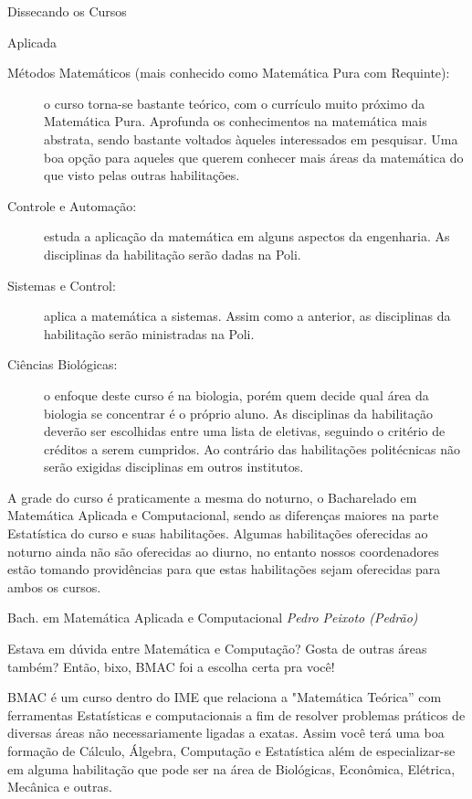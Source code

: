\begin{secao}{Dissecando os Cursos}
\begin{subsecao}{Aplicada}
\begin{description}
\item [Métodos Matemáticos (mais conhecido como Matemática Pura com Requinte):] o curso torna-se bastante teórico, com o currículo muito próximo da Matemática Pura. Aprofunda os conhecimentos na matemática mais abstrata, sendo bastante voltados àqueles interessados em pesquisar. Uma boa opção para aqueles que querem conhecer mais áreas da matemática do que visto pelas outras habilitações. 
\item [Controle e Automação:] estuda a aplicação da matemática em alguns aspectos da engenharia. As disciplinas da habilitação serão dadas na Poli.
\item  [Sistemas e Control:] aplica a matemática a sistemas. Assim como a anterior, as disciplinas da habilitação serão ministradas na Poli.
\item  [Ciências Biológicas:] o enfoque deste curso é na biologia, porém quem decide qual área da biologia se concentrar é o próprio aluno. As disciplinas da habilitação deverão ser escolhidas entre uma lista de eletivas, seguindo o critério de créditos a serem cumpridos. Ao contrário das habilitações politécnicas não serão exigidas disciplinas em outros institutos. 
\end{description}

A grade do curso é praticamente a mesma do noturno, o Bacharelado em Matemática Aplicada e Computacional, sendo as diferenças maiores na parte Estatística do curso e suas habilitações. Algumas habilitações oferecidas ao noturno ainda não são oferecidas ao diurno, no entanto nossos coordenadores estão tomando providências para que estas habilitações sejam oferecidas para ambos os cursos. 


\end{subsecao}

\begin{subsecao}{Bach. em Matemática Aplicada e Computacional}
{\em Pedro Peixoto (Pedrão)}

Estava em dúvida entre Matemática e Computação? Gosta de outras áreas também? Então, bixo, BMAC foi a escolha certa pra você! 

BMAC é um curso dentro do IME que relaciona a "Matemática Teórica” com ferramentas Estatísticas e computacionais a fim de resolver problemas práticos de diversas áreas não necessariamente ligadas a exatas. Assim você terá uma boa formação de Cálculo, Álgebra, Computação e Estatística além de especializar-se em alguma habilitação que pode ser na área de Biológicas, Econômica, Elétrica, Mecânica e outras.  


\end{subsecao}
\end{secao}
